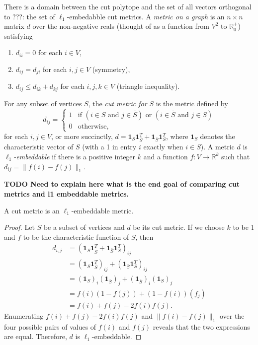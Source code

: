 \documentclass[11pt]{article}
\newcommand{\1}{\mathbf{1}}
\newcommand{\0}{\mathbf{0}}
\begin{document}
There is a domain between the cut polytope and the set of all vectors orthogonal to ???: the set of $\ell_1$-embedabble cut metrics.
A \emph{metric on a graph} is an $n \times n$ matrix $d$ over the non-negative reals (thought of as a function from $V^2$ to $\mathbb{R}^+_0$) satisfying
\begin{enumerate}
\item $d_{ii} = 0$ for each $i \in V$,
\item $d_{ij} = d_{ji}$ for each $i, j \in V$ (symmetry),
\item $d_{ij} \leq d_{ik} + d_{kj}$ for each $i, j, k \in V$ (triangle inequality).
\end{enumerate}
For any subset of vertices $S$, the \emph{cut metric for $S$} is the metric defined by
\begin{equation*}
  d_{ij} =
  \begin{cases}
    1 & \text{if } (i \in S \text{ and } j \in \bar{S}) \text{ or } (i \in \bar{S} \text{ and } j \in S) \\
    0 & \text{otherwise,}
  \end{cases}
\end{equation*}
for each $i, j \in V$, or more succinctly, $d = \1_S \1_{\bar{S}}^T + \1_{\bar{S}} \1_S^T$, where $\1_S$ denotes the characteristic vector of $S$ (with a 1 in entry $i$ exactly when $i \in S$).
A metric $d$ is \emph{$\ell_1$-embeddable} if there is a positive integer $k$ and a function $f \colon V \to \mathbb{R}^k$ such that $d_{ij} = \| f(i) - f(j) \|_1$.

\textbf{TODO Need to explain here what is the end goal of comparing cut metrics and l1 embeddable metrics.}

\begin{lemma}
  A cut metric is an $\ell_1$-embeddable metric.
\end{lemma}
\begin{proof}
  Let $S$ be a subset of vertices and $d$ be its cut metric.
  If we choose $k$ to be 1 and $f$ to be the characteristic function of $S$, then
  \begin{align*}
    d_{i, j} & = (\1_S \1^T_{\bar{S}} + \1_{\bar{S}} \1_S^T)_{ij} \\
    & = (\1_S \1^T_{\bar{S}})_{ij} + (\1_{\bar{S}} \1_S^T)_{ij} \\
    & = (\1_S)_i (\1_{\bar{S}})_j + (\1_{\bar{S}})_i (\1_S)_j \\
    & = f(i) (1 - f(j)) + (1- f(i)) (f_j) \\
    & = f(i) + f(j) - 2 f(i) f(j).
  \end{align*}
  Enumerating $f(i) + f(j) - 2 f(i) f(j)$ and $\|f(i) - f(j)\|_1$ over the four possible pairs of values of $f(i)$ and $f(j)$ reveals that the two expressions are equal.
  Therefore, $d$ is $\ell_1$-embeddable.
\end{proof}
\end{document}
